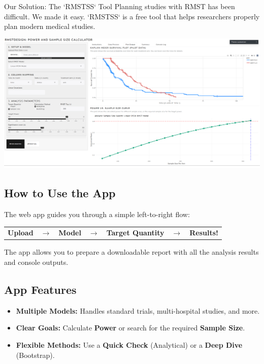 \documentclass[a0,landscape]{a0poster}
\begin{document}
\begin{minipage}[t]{0.34\linewidth} %

\begin{posterbox}{Our Solution: The `RMSTSS` Tool}
    \large
    Planning studies with RMST has been difficult. We made it easy. `RMSTSS` is a free tool that helps researchers properly plan modern medical studies.
    \begin{center}
        \vspace{0.25cm}
        \includegraphics[width=\linewidth]{app-ss.png}
        \vspace{0.25cm}
    \end{center}
    
    \subsection*{\Large How to Use the App}
    \large
    The web app guides you through a simple left-to-right flow:
    \begin{center}
        \Large
        \begin{tabular}{ccccccc}
            \textbf{Upload} & $\boldsymbol{\rightarrow}$ & \textbf{Model} & $\boldsymbol{\rightarrow}$ & \textbf{Target Quantity} & $\boldsymbol{\rightarrow}$ & \textbf{Results!} \\
        \end{tabular}
        
        \vspace{0.2cm}
        \large
        The app allows you to prepare a downloadable report with all the analysis results and console outputs.
    \end{center}

    \subsection*{\Large App Features}
    \begin{itemize} \itemsep=0.25em
        \item \large \textbf{Multiple Models:} Handles standard trials, multi-hospital studies, and more.
        \item \large \textbf{Clear Goals:} Calculate \textbf{Power} or search for the required \textbf{Sample Size}.
        \item \large \textbf{Flexible Methods:} Use a \textbf{Quick Check} (Analytical) or a \textbf{Deep Dive} (Bootstrap).
    \end{itemize}
    

\end{posterbox}
\end{minipage}
\end{document}
